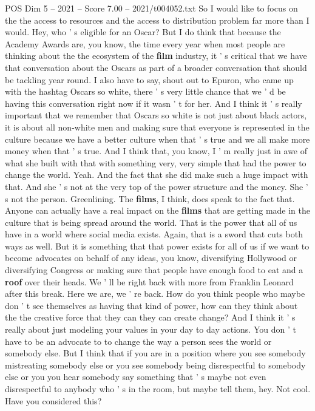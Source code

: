 \begin{textsample}{POS Dim 5 – 2021 – Score 7.00 – 2021/t004052.txt}
So I would like to focus on the the access to resources and the access to distribution problem far more than I would.
Hey, who ' s eligible for an Oscar?
But I do think that because the Academy Awards are, you know, the time every year when most people are thinking about the the ecosystem of the \textbf{film} industry, it ' s critical that we have that conversation about the Oscars as part of a broader conversation that should be tackling year round.
I also have to say, shout out to Epuron, who came up with the hashtag Oscars so white, there ' s very little chance that we ' d be having this conversation right now if it wasn ' t for her.
And I think it ' s really important that we remember that Oscars so white is not just about black actors, it is about all non-white men and making sure that everyone is represented in the culture because we have a better culture when that ' s true and we all make more money when that ' s true.
And I think that, you know, I ' m really just in awe of what she built with that with something very, very simple that had the power to change the world.
Yeah.
And the fact that she did make such a huge impact with that.
And she ' s not at the very top of the power structure and the money.
She ' s not the person.
Greenlining.
The \textbf{films}, I think, does speak to the fact that.
Anyone can actually have a real impact on the \textbf{films} that are getting made in the culture that is being spread around the world.
That is the power that all of us have in a world where social media exists.
Again, that is a sword that cuts both ways as well.
But it is something that that power exists for all of us if we want to become advocates on behalf of any ideas, you know, diversifying Hollywood or diversifying Congress or making sure that people have enough food to eat and a \textbf{roof} over their heads.
We ' ll be right back with more from Franklin Leonard after this break.
Here we are, we ' re back.
How do you think people who maybe don ' t see themselves as having that kind of power, how can they think about the the creative force that they can they can create change?
And I think it ' s really about just modeling your values in your day to day actions.
You don ' t have to be an advocate to to change the way a person sees the world or somebody else.
But I think that if you are in a position where you see somebody mistreating somebody else or you see somebody being disrespectful to somebody else or you you hear somebody say something that ' s maybe not even disrespectful to anybody who ' s in the room, but maybe tell them, hey.
Not cool.
Have you considered this?

\end{textsample}
